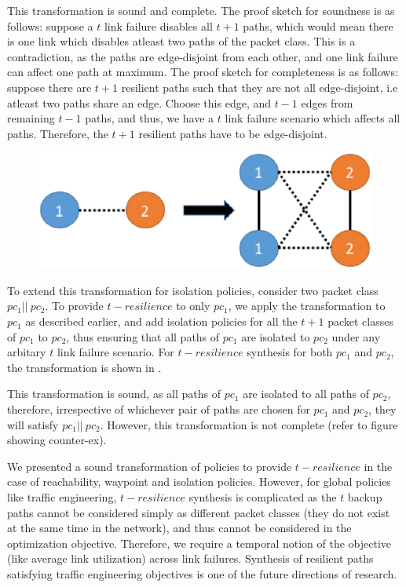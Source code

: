 This transformation is sound and complete. The proof sketch for soundness
 is as follows: suppose a $t$ link failure
disables all $t+1$ paths, which would mean there is one link which disables atleast two paths
of the packet class. This is a contradiction, as the paths are edge-disjoint from each other, and one
link failure can affect one path at maximum. The proof sketch for completeness is as follows:
suppose there are $t+1$ resilient paths such that they are not all edge-disjoint, i.e atleast two
paths share an edge. Choose this edge, and $t-1$ edges from remaining $t-1$ paths, and
thus, we have a $t$ link failure scenario which affects all paths. Therefore, the $t+1$ resilient
paths have to be edge-disjoint.
\begin{figure}
	\includegraphics[width=0.8\columnwidth,center]{figures/resilience-transform.eps}
	\label{fig:restransform}
\end{figure}
To extend this transformation for isolation policies, consider two packet class $pc_1 ||\ pc_2$. 
To provide $t-resilience$ to only $pc_1$, we apply the transformation to $pc_1$ as described
earlier, and add isolation policies for all the $t+1$ packet classes of $pc_1$ to $pc_2$,
thus ensuring that all paths of $pc_1$ are isolated to $pc_2$ under any arbitary $t$ link 
failure scenario. For $t-resilience$ synthesis for both $pc_1$ and $pc_2$, the transformation
is shown in .

This transformation is sound, as all paths of $pc_1$ are isolated to all paths of $pc_2$,
therefore, irrespective of whichever pair of paths are chosen for $pc_1$ and $pc_2$,
they will satisfy $pc_1 || \ pc_2$.
 However, this transformation is not complete (refer to 
figure showing counter-ex). 

We presented a sound transformation of policies to provide $t-resilience$ in
the case of reachability, waypoint and isolation policies. However, for global policies like 
traffic engineering, $t-resilience$ synthesis is complicated as the $t$ backup paths 
cannot be considered simply as different packet classes (they do not exist at the same time
in the network),
and thus cannot be considered in the optimization objective. Therefore, we require a 
temporal notion of the objective (like average link utilization) across link failures. Synthesis of resilient paths
satisfying traffic engineering objectives is one of the future directions of research.